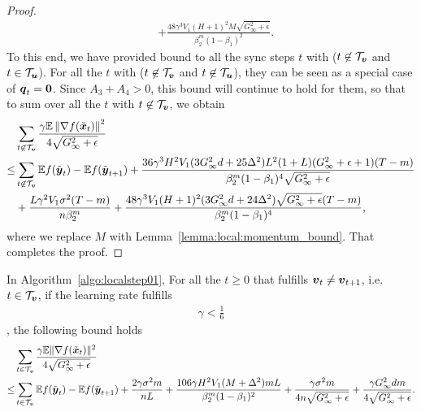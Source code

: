 \begin{proof}
\begin{align*}
    & + \frac{48\gamma^3V_1(H+1)^2M\sqrt{G_\infty^2+\epsilon}}{\beta_2^m(1-\beta_1)^2}.
\end{align*}
To this end, we have provided bound to all the sync steps $t$ with  ($t\not\in\mathcal{T}_{\boldsymbol{v}}$ and $t\in\mathcal{T}_{\boldsymbol{u}}$). For all the $t$ with  ($t\not\in\mathcal{T}_{\boldsymbol{v}}$ and $t\not\in\mathcal{T}_{\boldsymbol{u}}$), they can be seen as a special case of $\boldsymbol{q}_t=\boldsymbol{0}$. Since $A_3+A_4>0$, this bound will continue to hold for them, so that to sum over all the $t$ with $t\not\in\mathcal{T}_{\boldsymbol{v}}$, we obtain
\begin{align*}
    & \sum_{t\not\in\mathcal{T}_{\boldsymbol{v}}}\frac{\gamma\mathbb E\left\| \nabla f(\tilde{\boldsymbol{x}}_t) \right\|^2}{4\sqrt{G_\infty^2+\epsilon}} \\
    \leq & \sum_{t\not\in\mathcal{T}_{\boldsymbol{v}}}\mathbb E f(\tilde{\boldsymbol{y}}_{t}) - \mathbb Ef(\tilde{\boldsymbol{y}}_{t+1}) + \frac{36\gamma^3H^2V_1(3G_\infty^2d+25\Delta^2)L^2(1+L)(G_\infty^2+\epsilon+1)(T-m)}{\beta_2^m(1-\beta_1)^4\sqrt{G_\infty^2+\epsilon}} \\
    & + \frac{L\gamma^2V_1\sigma^2(T-m)}{n\beta_2^m} + \frac{48\gamma^3V_1(H+1)^2(3G_\infty^2d+24\Delta^2)\sqrt{G_\infty^2+\epsilon}(T-m)}{\beta_2^m(1-\beta_1)^4},
\end{align*}
where we replace $M$ with Lemma~\ref{lemma:local:momentum_bound}.
That completes the proof.
\end{proof}

\begin{lemma}
\label{lemma:local:var_step}
In Algorithm~\ref{algo:localstep01}, For all the $t\geq 0$ that fulfills $\boldsymbol{v}_t\neq\boldsymbol{v}_{t+1}$, i.e. $t\in\mathcal{T}_{\boldsymbol{v}}$, 
if the learning rate fulfills
\begin{align*}
    \gamma < \frac{1}{6}
\end{align*},
the following bound holds
\begin{align*}
    & \sum_{t\in\mathcal{T}_{\boldsymbol{v}}}\frac{\gamma\mathbb{E}\|\nabla f(\tilde{\boldsymbol{x}}_t)\|^2}{4\sqrt{G_\infty^2+\epsilon}} \\
    \leq & \sum_{t\in\mathcal{T}_{\boldsymbol{v}}}\mathbb E f(\tilde{\boldsymbol{y}}_{t}) - \mathbb Ef(\tilde{\boldsymbol{y}}_{t+1}) + \frac{2\gamma\sigma^2m}{nL} +  \frac{106\gamma H^2V_1(M+\Delta^2)mL}{\beta_2^m(1-\beta_1)^2} + \frac{\gamma\sigma^2m}{4n\sqrt{G_\infty^2+\epsilon}} + \frac{\gamma G_\infty^2dm}{4\sqrt{G_\infty^2+\epsilon}}.
\end{align*}
\end{lemma}

